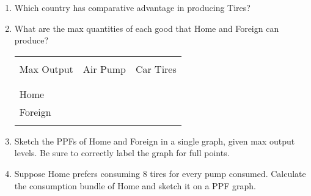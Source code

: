 \documentclass[12pt]{article}
\begin{document}
\begin{enumerate}[1)]
	
	\item Which country has comparative advantage in producing Tires?
	
	\newpage
	
	\item What are the max quantities of each good that Home and Foreign can produce?
	
	\vspace{2.0in}
	
	\begin{table}[!h]
		\centering
		\begin{tabular}[t]{l c c }
			\hline
			&&\\
			Max Output & Air Pump & Car Tires  \\
			&&\\
			\hline
			&&\\
			Home &  &   \\
			Foreign &  &  \\
			&&\\
			\hline
		\end{tabular}
	\end{table}
	
	\item Sketch the PPFs of Home and Foreign in a single graph, given max output levels. Be sure to correctly label the graph for full points. 
	
	\bigskip
	
	\bigskip
	
	\bigskip
	
	\bigskip
	
	\newpage
	
	\item Suppose Home prefers consuming 8 tires for every pump consumed. Calculate the consumption bundle of Home and sketch it on a PPF graph.
	
	\bigskip
	
	\bigskip
	
	\bigskip
	
	\bigskip
	
	\bigskip
	
	\bigskip
	
	\bigskip
	
	\bigskip
	
	\bigskip
	
	\bigskip
	
	\bigskip
	
	\bigskip
	

\end{enumerate}
\end{document}
